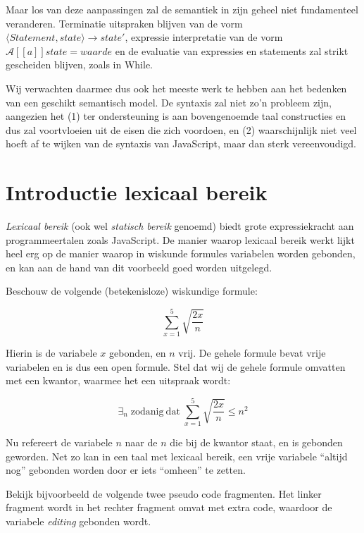 \documentclass[a4paper,11pt]{article}
\begin{document}
Maar los van deze aanpassingen zal de semantiek in zijn geheel niet fundamenteel veranderen. Terminatie uitspraken blijven van de vorm $\langle \mathit{Statement}, \mathit{state}\rangle \longrightarrow \mathit{state}'$, expressie interpretatie van de vorm $\mathcal{A}{[\![a]\!]}\mathit{state} = \mathit{waarde}$ en de evaluatie van expressies en statements zal strikt gescheiden blijven, zoals in While.

Wij verwachten daarmee dus ook het meeste werk te hebben aan het bedenken van een geschikt semantisch model. De syntaxis zal niet zo'n probleem zijn, aangezien het (1) ter ondersteuning is aan bovengenoemde taal constructies en dus zal voortvloeien uit de eisen die zich voordoen, en (2) waarschijnlijk niet veel hoeft af te wijken van de syntaxis van JavaScript, maar dan sterk vereenvoudigd.

\section*{Introductie lexicaal bereik}

\emph{Lexicaal bereik} (ook wel \emph{statisch bereik} genoemd) biedt grote expressiekracht aan programmeertalen zoals JavaScript. De manier waarop lexicaal bereik werkt lijkt heel erg op de manier waarop in wiskunde formules variabelen worden gebonden, en kan aan de hand van dit voorbeeld goed worden uitgelegd.

Beschouw de volgende (betekenisloze) wiskundige formule:

\begin{equation*}
	\sum_{x=1}^5{\sqrt{\frac{2x}{n}}}
\end{equation*}

Hierin is de variabele $x$ gebonden, en $n$ vrij. De gehele formule bevat vrije variabelen en is dus een open formule. Stel dat wij de gehele formule omvatten met een kwantor, waarmee het een uitspraak wordt:

\begin{equation*}
	\exists_n\; \mathrm{zodanig~dat}\;
	\sum_{x=1}^5{\sqrt{\frac{2x}{n}}}
	\le n^2
\end{equation*}

Nu refereert de variabele $n$ naar de $n$ die bij de kwantor staat, en is gebonden geworden. Net zo kan in een taal met lexicaal bereik, een vrije variabele ``altijd nog'' gebonden worden door er iets ``omheen'' te zetten.

Bekijk bijvoorbeeld de volgende twee pseudo code fragmenten. Het linker fragment wordt in het rechter fragment omvat met extra code, waardoor de variabele \textit{editing} gebonden wordt.
\end{document}
